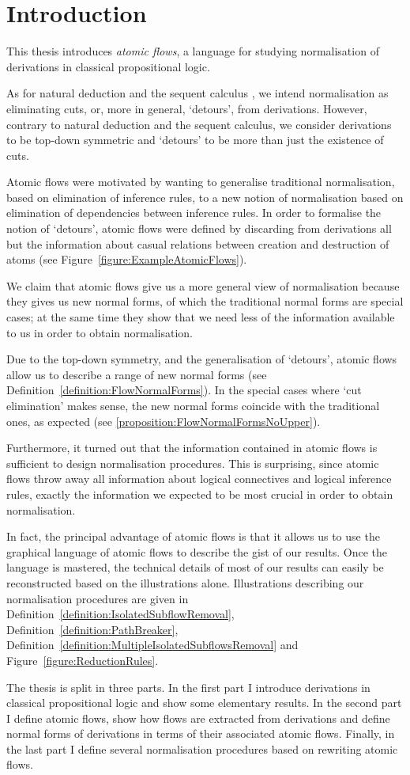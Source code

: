 \chapter{Introduction}

This thesis introduces \emph{atomic flows}, a language for studying normalisation of derivations in classical propositional logic.

As for natural deduction and the sequent calculus \cite{Gent:69:Investig:xi}, we intend normalisation as eliminating cuts, or, more in general, `detours', from derivations. However, contrary to natural deduction and the sequent calculus, we consider derivations to be top-down symmetric and `detours' to be more than just the existence of cuts.

Atomic flows were motivated by wanting to generalise traditional normalisation, based on elimination of inference rules, to a new notion of normalisation based on elimination of dependencies between inference rules. In order to formalise the notion of `detours', atomic flows were defined by discarding from derivations all but the information about casual relations between creation and destruction of atoms (see Figure~\vref{figure:ExampleAtomicFlows}).

We claim that atomic flows give us a more general view of normalisation because they gives us new normal forms, of which the traditional normal forms are special cases; at the same time they show that we need less of the information available to us in order to obtain normalisation.

Due to the top-down symmetry, and the generalisation of `detours', atomic flows allow us to describe a range of new normal forms (see Definition~\vref{definition:FlowNormalForms}). In the special cases where `cut elimination' makes sense, the new normal forms coincide with the traditional ones, as expected (see \vref{proposition:FlowNormalFormsNoUpper}).

Furthermore, it turned out that the information contained in atomic flows is sufficient to design normalisation procedures. This is surprising, since atomic flows throw away all information about logical connectives and logical inference rules, exactly the information we expected to be most crucial in order to obtain normalisation.

In fact, the principal advantage of atomic flows is that it allows us to use the graphical language of atomic flows to describe the gist of our results. Once the language is mastered, the technical details of most of our results can easily be reconstructed based on the illustrations alone. Illustrations describing our normalisation procedures are given in Definition~\vref{definition:IsolatedSubflowRemoval}, Definition~\vref{definition:PathBreaker}, Definition~\vref{definition:MultipleIsolatedSubflowsRemoval} and Figure~\vref{figure:ReductionRules}.

The thesis is split in three parts. In the first part I introduce derivations in classical propositional logic and show some elementary results. In the second part I define atomic flows, show how flows are extracted from derivations and define normal forms of derivations in terms of their associated atomic flows. Finally, in the last part I define several normalisation procedures based on rewriting atomic flows.
